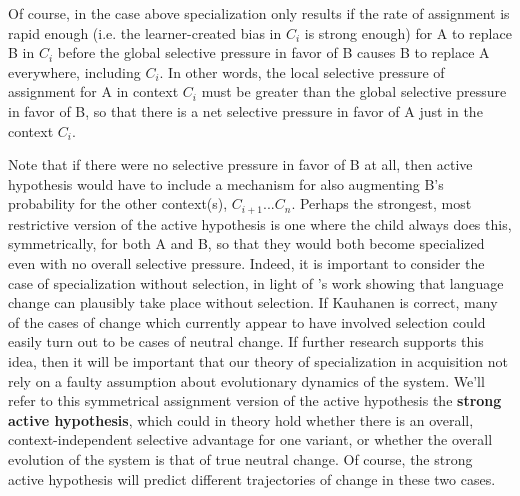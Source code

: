 Of course, in the case above specialization only results if the rate of assignment is rapid enough (i.e. the learner-created bias in $C_i$ is strong enough) for A to replace B in $C_i$ before the global selective pressure in favor of B causes B to replace A everywhere, including $C_i$.
In other words, the local selective pressure of assignment for A in context $C_i$ must be greater than the global selective pressure in favor of B, so that there is a net selective pressure in favor of A just in the context $C_i$.

Note that if there were no selective pressure in favor of B at all, then active hypothesis would have to include a mechanism for also augmenting B's probability for the other context(s), $C_{i+1}$...$C_n$.
Perhaps the strongest, most restrictive version of the active hypothesis is one where the child always does this, symmetrically, for both A and B, so that they would both become specialized even with no overall selective pressure.
Indeed, it is important to consider the case of specialization without selection, in light of \citet{kauhanen2016}'s work showing that language change can plausibly take place without selection.
If Kauhanen is correct, many of the cases of change which currently appear to have involved selection could easily turn out to be cases of neutral change.
If further research supports this idea, then it will be important that our theory of specialization in acquisition not rely on a faulty assumption about evolutionary dynamics of the system.
We'll refer to this symmetrical assignment version of the active hypothesis the \textbf{strong active hypothesis}, which could in theory hold whether there is an overall, context-independent selective advantage for one variant, or whether the overall evolution of the system is that of true neutral change.
Of course, the strong active hypothesis will predict different trajectories of change in these two cases.




